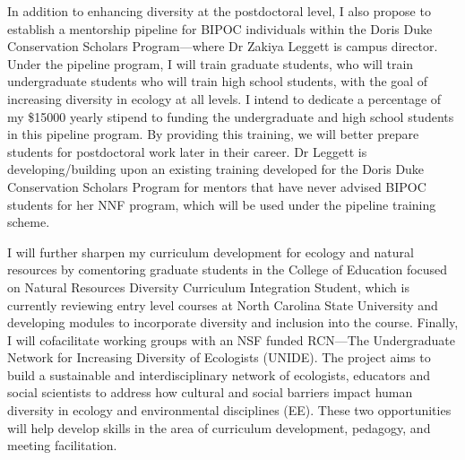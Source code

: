 \documentclass[11pt]{article}\usepackage[]{graphicx}\usepackage[]{color}
\begin{document}
In addition to enhancing diversity at the postdoctoral level, I also propose to establish a mentorship pipeline for BIPOC individuals within the Doris Duke Conservation Scholars Program---where Dr Zakiya Leggett is campus director. Under the pipeline program, I will train graduate students, who will train undergraduate students who will train high school students, with the goal of increasing diversity in ecology at all levels. I intend to dedicate a percentage of my \$15000 yearly stipend to funding the undergraduate and high school students in this pipeline program. By providing this training, we will better prepare students for postdoctoral work later in their career. Dr Leggett is developing/building upon an existing training developed for the Doris Duke Conservation Scholars Program for mentors that have never advised BIPOC students for her NNF program, which will be used under the pipeline training scheme.

I will further sharpen my curriculum development for ecology and natural resources by co\-mentoring graduate students in the College of Education focused on Natural Resources Diversity Curriculum Integration
Student, which is currently reviewing entry level courses at North Carolina State University and developing modules to incorporate diversity and inclusion into the course.
Finally, I will co\-facilitate working groups with an NSF funded RCN---The Undergraduate Network for Increasing Diversity of Ecologists (UNIDE). The project aims to build a sustainable and interdisciplinary network of ecologists, educators and social scientists to address how cultural and social barriers impact human diversity in ecology and environmental disciplines (EE). These two opportunities will help develop skills in the area of curriculum development, pedagogy, and meeting facilitation.\\
\end{document}

